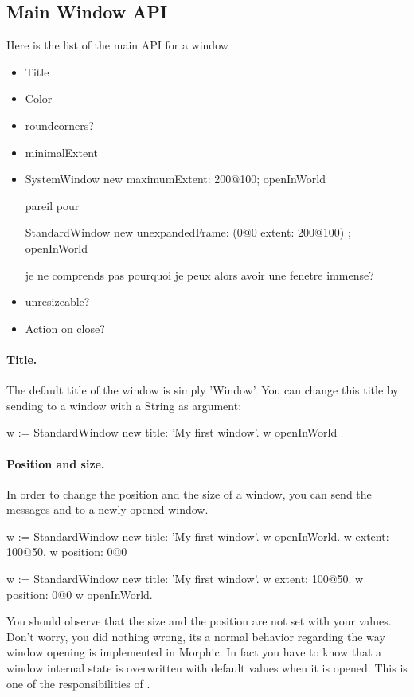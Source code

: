\documentclass[a4paper,10pt,twoside]{book}
\begin{document}
\subsection{Main Window API}

 Here is the list of the main API for a window

\begin{itemize}
\item Title
\item Color
\item roundcorners?
\item minimalExtent
\item 

\begin{code}{}
SystemWindow new
	maximumExtent: 200@100; openInWorld

pareil pour 

StandardWindow new
	unexpandedFrame: (0@0 extent: 200@100) ; openInWorld
\end{code}

je ne comprends pas pourquoi je peux alors avoir une fenetre immense? 

\item unresizeable? 
\item Action on close? 
\end{itemize}

\paragraph*{Title.}
The default title of the window is simply 'Window'. You can change this title by sending  to a window with a String as argument:
\begin{code}{}
w := StandardWindow new title: 'My first window'.
w openInWorld
\end{code}
\paragraph*{Position and size.}
In order to change the position and the size of a window, you can send the messages  and  to a newly opened window. 
\begin{code}{}
w := StandardWindow new title: 'My first window'.
w openInWorld.
w extent: 100@50.
w position: 0@0
\end{code}
\begin{code}{}
w := StandardWindow new title: 'My first window'.
w extent: 100@50.
w position: 0@0
w openInWorld.
\end{code}
You should observe that the size and the position are not set with your values. Don't worry, you did nothing wrong, its a normal behavior regarding the way window opening is implemented in Morphic. In fact you have to know that a window internal state is overwritten with default values when it is opened. This is one of the responsibilities of . 
\end{document}
